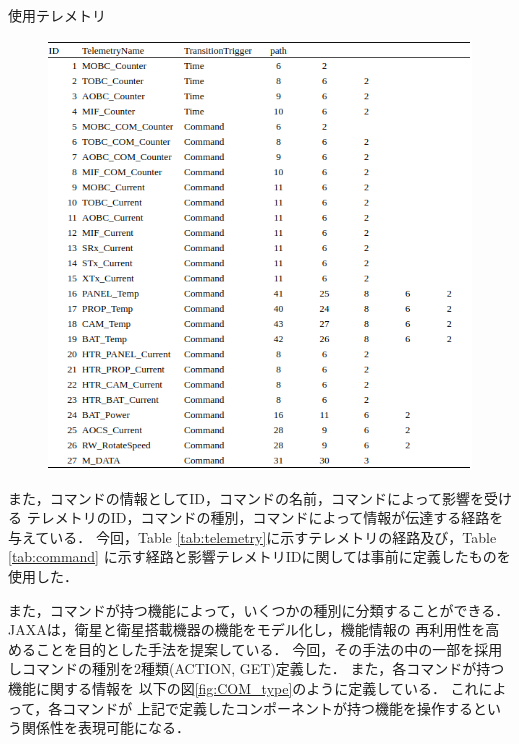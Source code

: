 \documentclass[11pt]{jsreport}
\begin{document}
\newpage
\begin{table}[H]
   \centering
   \caption{使用テレメトリ}
   \label{tab:telemetry}
\end{table}
\vspace{-2zh}
\begin{figure}[H]
   \centering
      \includegraphics[width=14.0cm]{figure/TEL.png}
\end{figure}

また，コマンドの情報としてID，コマンドの名前，コマンドによって影響を受ける
テレメトリのID，コマンドの種別，コマンドによって情報が伝達する経路を与えている．
今回，Table \ref{tab:telemetry}に示すテレメトリの経路及び，Table \ref{tab:command}
に示す経路と影響テレメトリIDに関しては事前に定義したものを使用した．

また，コマンドが持つ機能によって，いくつかの種別に分類することができる．
JAXA\cite{JAXA2020}は，衛星と衛星搭載機器の機能をモデル化し，機能情報の
再利用性を高めることを目的とした手法を提案している．
今回，その手法の中の一部を採用しコマンドの種別を2種類(ACTION, GET)定義した．
また，各コマンドが持つ機能に関する情報を
以下の図\ref{fig:COM_type}のように定義している．
これによって，各コマンドが
上記で定義したコンポーネントが持つ機能を操作するという関係性を表現可能になる．
\end{document}
